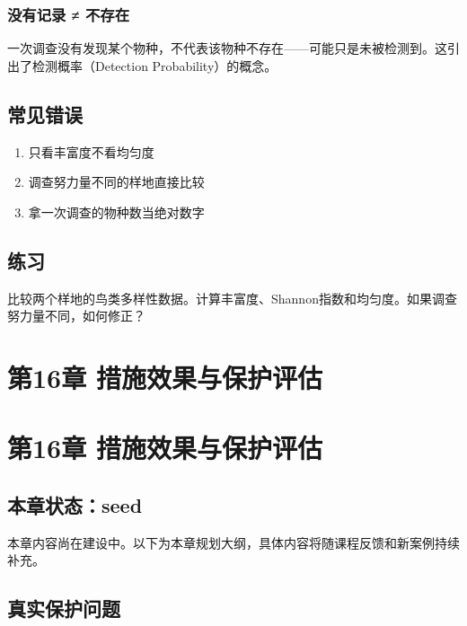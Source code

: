 \documentclass[
  letterpaper,
]{scrbook}
\providecommand{\tightlist}{%
  \setlength{\itemsep}{0pt}\setlength{\parskip}{0pt}}
\begin{document}
\subsection{没有记录 ≠
不存在}\label{ux6ca1ux6709ux8bb0ux5f55-ux4e0dux5b58ux5728}

一次调查没有发现某个物种，不代表该物种不存在------可能只是未被检测到。这引出了检测概率（Detection
Probability）的概念。

\section{常见错误}\label{ux5e38ux89c1ux9519ux8bef-12}

\begin{enumerate}
\def\labelenumi{\arabic{enumi}.}
\tightlist
\item
  只看丰富度不看均匀度
\item
  调查努力量不同的样地直接比较
\item
  拿一次调查的物种数当绝对数字
\end{enumerate}

\section{练习}\label{ux7ec3ux4e60-14}

比较两个样地的鸟类多样性数据。计算丰富度、Shannon指数和均匀度。如果调查努力量不同，如何修正？

\chapter{第16章
措施效果与保护评估}\label{ux7b2c16ux7ae0-ux63aaux65bdux6548ux679cux4e0eux4fddux62a4ux8bc4ux4f30}

\chapter{第16章
措施效果与保护评估}\label{ux7b2c16ux7ae0-ux63aaux65bdux6548ux679cux4e0eux4fddux62a4ux8bc4ux4f30-1}

\section{本章状态：seed}\label{ux672cux7ae0ux72b6ux6001seed-5}

本章内容尚在建设中。以下为本章规划大纲，具体内容将随课程反馈和新案例持续补充。

\section{真实保护问题}\label{ux771fux5b9eux4fddux62a4ux95eeux9898-12}
\end{document}
